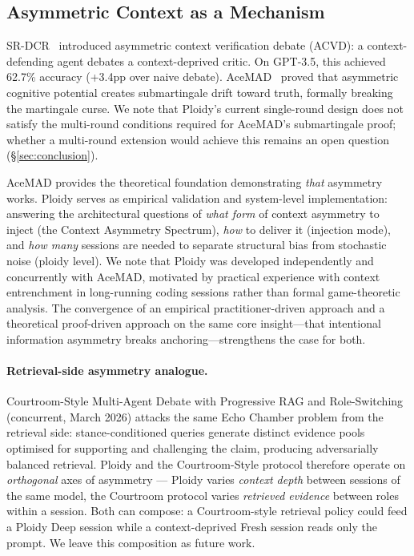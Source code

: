 \documentclass[11pt]{article}
\begin{document}
\subsection{Asymmetric Context as a Mechanism}
\label{sec:asymmetric}

SR-DCR~\citep{srdcr2025} introduced asymmetric context verification debate (ACVD): a context-defending agent debates a context-deprived critic. On GPT-3.5, this achieved 62.7\% accuracy (+3.4pp over naive debate). AceMAD~\citep{liu2026acemad} proved that asymmetric cognitive potential creates submartingale drift toward truth, formally breaking the martingale curse. We note that Ploidy's current single-round design does not satisfy the multi-round conditions required for AceMAD's submartingale proof; whether a multi-round extension would achieve this remains an open question (\S\ref{sec:conclusion}).

AceMAD provides the theoretical foundation demonstrating \emph{that} asymmetry works. Ploidy serves as empirical validation and system-level implementation: answering the architectural questions of \emph{what form} of context asymmetry to inject (the Context Asymmetry Spectrum), \emph{how} to deliver it (injection mode), and \emph{how many} sessions are needed to separate structural bias from stochastic noise (ploidy level). We note that Ploidy was developed independently and concurrently with AceMAD, motivated by practical experience with context entrenchment in long-running coding sessions rather than formal game-theoretic analysis. The convergence of an empirical practitioner-driven approach and a theoretical proof-driven approach on the same core insight---that intentional information asymmetry breaks anchoring---strengthens the case for both.

\paragraph{Retrieval-side asymmetry analogue.} Courtroom-Style Multi-Agent Debate with Progressive RAG and Role-Switching~\citep{courtroom2026rag} (concurrent, March 2026) attacks the same Echo Chamber problem from the retrieval side: stance-conditioned queries generate distinct evidence pools optimised for supporting and challenging the claim, producing adversarially balanced retrieval. Ploidy and the Courtroom-Style protocol therefore operate on \emph{orthogonal} axes of asymmetry --- Ploidy varies \emph{context depth} between sessions of the same model, the Courtroom protocol varies \emph{retrieved evidence} between roles within a session. Both can compose: a Courtroom-style retrieval policy could feed a Ploidy Deep session while a context-deprived Fresh session reads only the prompt. We leave this composition as future work.
\end{document}

